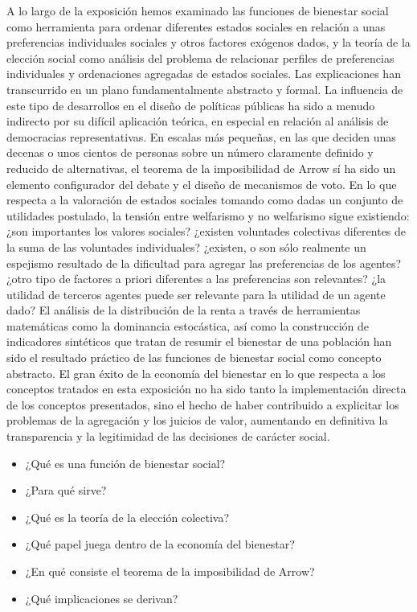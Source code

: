 \documentclass{nuevotema}
\begin{document}
A lo largo de la exposición hemos examinado las funciones de bienestar social como herramienta para ordenar diferentes estados sociales en relación a unas preferencias individuales sociales y otros factores exógenos dados, y la teoría de la elección social como análisis del problema de relacionar perfiles de preferencias individuales y ordenaciones agregadas de estados sociales. Las explicaciones han transcurrido en un plano fundamentalmente abstracto y formal. La influencia de este tipo de desarrollos en el diseño de políticas públicas ha sido a menudo indirecto por su difícil aplicación teórica, en especial en relación al análisis de democracias representativas. En escalas más pequeñas, en las que deciden unas decenas o unos cientos de personas sobre un número claramente definido y reducido de alternativas, el teorema de la imposibilidad de Arrow sí ha sido un elemento configurador del debate y el diseño de mecanismos de voto. En lo que respecta a la valoración de estados sociales tomando como dadas un conjunto de utilidades postulado, la tensión entre welfarismo y no welfarismo sigue existiendo: ¿son importantes los valores sociales? ¿existen voluntades colectivas diferentes de la suma de las voluntades individuales? ¿existen, o son sólo realmente un espejismo resultado de la dificultad para agregar las preferencias de los agentes? ¿otro tipo de factores a priori diferentes a las preferencias son relevantes? ¿la utilidad de terceros agentes puede ser relevante para la utilidad de un agente dado? El análisis de la distribución de la renta a través de herramientas matemáticas como la dominancia estocástica, así como la construcción de indicadores sintéticos que tratan de resumir el bienestar de una población han sido el resultado práctico de las funciones de bienestar social como concepto abstracto. El gran éxito de la economía del bienestar en lo que respecta a los conceptos tratados en esta exposición no ha sido tanto la implementación directa de los conceptos presentados, sino el hecho de haber contribuido a explicitar los problemas de la agregación y los juicios de valor, aumentando en definitiva la transparencia y la legitimidad de las decisiones de carácter social. 

\begin{itemize}
	\item ¿Qué es una función de bienestar social?
	\item ¿Para qué sirve?
	\item ¿Qué es la teoría de la elección colectiva?
	\item ¿Qué papel juega dentro de la economía del bienestar?
	\item ¿En qué consiste el teorema de la imposibilidad de Arrow?
	\item ¿Qué implicaciones se derivan?
\end{itemize}
\end{document}
